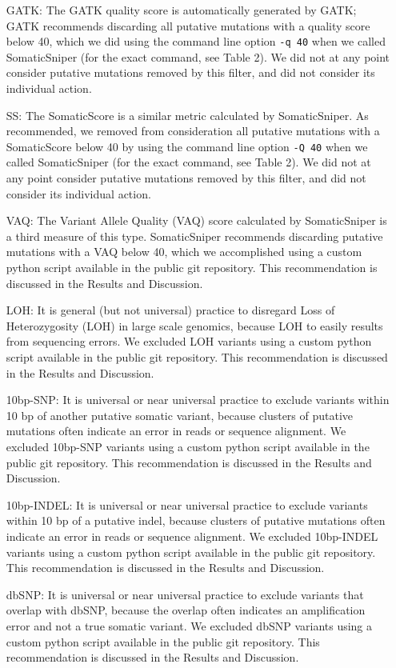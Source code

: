 \documentclass[11pt]{article} %
\begin{document}
\begin{itemize}
\item[GATK:] The GATK quality score is automatically generated by GATK; GATK recommends discarding all putative mutations with a quality score below 40, which we did using the command line option \texttt{-q 40} when we called SomaticSniper (for the exact command, see Table 2). We did not at any point consider putative mutations removed by this filter, and did not consider its individual action. 
\item[SS:] The SomaticScore is a similar metric calculated by SomaticSniper. As recommended, we removed from consideration all putative mutations with a SomaticScore below 40 by using the command line option \texttt{-Q 40} when we called SomaticSniper (for the exact command, see Table 2). We did not at any point consider putative mutations removed by this filter, and did not consider its individual action. 
\item[VAQ:] The Variant Allele Quality (VAQ) score calculated by SomaticSniper is a third measure of this type. SomaticSniper recommends discarding putative mutations with a VAQ below 40, which we accomplished using a custom python script available in the public git repository. This recommendation is discussed in the Results and Discussion.
\item[LOH:] It is general (but not universal) practice to disregard Loss of Heterozygosity (LOH) in large scale genomics, because LOH to easily results from sequencing errors. We excluded LOH variants using a custom python script available in the public git repository. This recommendation is discussed in the Results and Discussion.
\item[10bp-SNP:] It is universal or near universal practice to exclude variants within 10 bp of another putative somatic variant, because clusters of putative mutations often indicate an error in reads or sequence alignment. We excluded 10bp-SNP variants using a custom python script available in the public git repository. This recommendation is discussed in the Results and Discussion.
\item[10bp-INDEL:] It is universal or near universal practice to exclude variants within 10 bp of a putative indel, because clusters of putative mutations often indicate an error in reads or sequence alignment. We excluded 10bp-INDEL variants using a custom python script available in the public git repository. This recommendation is discussed in the Results and Discussion.
\item[dbSNP:] It is universal or near universal practice to exclude variants that overlap with dbSNP, because the overlap often indicates an amplification error and not a true somatic variant. We excluded dbSNP variants using a custom python script available in the public git repository. This recommendation is discussed in the Results and Discussion.

\end{itemize}
\end{document}
